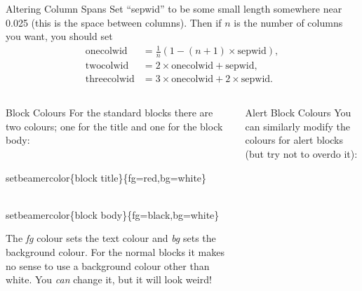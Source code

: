\documentclass[final]{beamer}
\newlength{\sepwid}
\newlength{\onecolwid}
\newlength{\twocolwid}
\newlength{\threecolwid}
\begin{document}
\begin{frame}[t]
\begin{columns}[t]
\begin{column}{\threecolwid}
\begin{block}{Altering Column Spans}
        Set ``sepwid'' to be some small length somewhere near 0.025 (this is the space between columns). Then if $n$ is the number of columns you want, you should set
        \begin{align*}
          \text{onecolwid} & = \frac{1}{n}(1-(n+1)\times\text{sepwid}), \\
          \text{twocolwid} & = 2\times\text{onecolwid} + \text{sepwid}, \\
          \text{threecolwid} & = 3\times\text{onecolwid} + 2\times\text{sepwid}.
        \end{align*}
      \end{block}
      \begin{columns}[t,totalwidth=\threecolwid]	%
        \begin{column}{\onecolwid}
          \begin{block}{Block Colours}
            For the standard blocks there are two colours; one for the title and one for the block body:\\
            \begin{semiverbatim}
              {\color{red}\\setbeamercolor}\{block title\}\newline \{fg=red,bg=white\}
            \end{semiverbatim}
            \begin{semiverbatim}
              {\color{red}\\setbeamercolor}\{block  body\}\newline \{fg=black,bg=white\}
            \end{semiverbatim}
            The \emph{fg} colour sets the text colour and \emph{bg} sets the background colour.
            For the normal blocks it makes no sense to use a background colour other than white. You \emph{can} change it, but it will look weird!
          \end{block}
        \end{column}
        \begin{column}{\onecolwid}
          \begin{alertblock}{Alert Block Colours}
            You can similarly modify the colours for alert blocks (but try not to overdo it):\\

\end{alertblock}
\end{column}
\end{columns}
\end{column}
\end{columns}
\end{frame}
\end{document}
